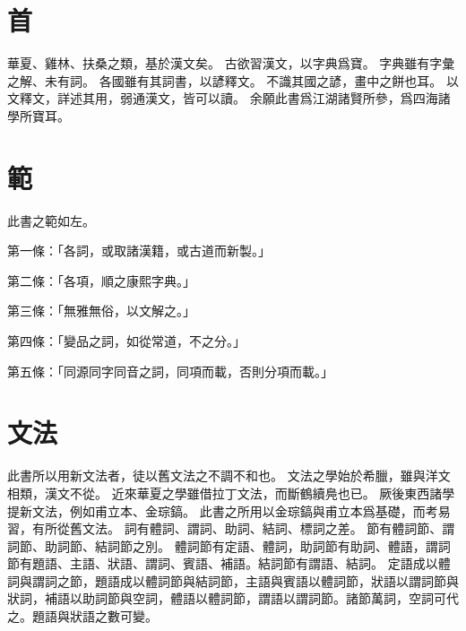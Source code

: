 \section{首}
華夏、雞林、扶桑之類，基於漢文矣。
古欲習漢文，以字典爲寶。
字典雖有字彙之解、未有詞。
各國雖有其詞書，以諺釋文。
不識其國之諺，畫中之餅也耳。
以文釋文，詳述其用，弱通漢文，皆可以讀。
余願此書爲江湖諸賢所參，爲四海諸學所寶耳。
\section{範}
此書之範如左。
\par 第一條：「各詞，或取諸漢籍，或古道而新製。」
\par 第二條：「各項，順之康熙字典。」
\par 第三條：「無雅無俗，以文解之。」
\par 第四條：「變品之詞，如從常道，不之分。」
\par 第五條：「同源同字同音之詞，同項而載，否則分項而載。」
\section{文法}
此書所以用新文法者，徒以舊文法之不調不和也。
文法之學始於希臘，雖與洋文相類，漢文不從。
近來華夏之學雖借拉丁文法，而斷鶴續鳧也已。
厥後東西諸學提新文法，例如甫立本、金琮鎬。
此書之所用以金琮鎬與甫立本爲基礎，而考易習，有所從舊文法。
詞有體詞、謂詞、助詞、結詞、標詞之差。
節有體詞節、謂詞節、助詞節、結詞節之別。
體詞節有定語、體詞，助詞節有助詞、體語，謂詞節有題語、主語、狀語、謂詞、賓語、補語。結詞節有謂語、結詞。
定語成以體詞與謂詞之節，題語成以體詞節與結詞節，主語與賓語以體詞節，狀語以謂詞節與狀詞，補語以助詞節與空詞，體語以體詞節，謂語以謂詞節。諸節萬詞，空詞可代之。題語與狀語之數可變。
